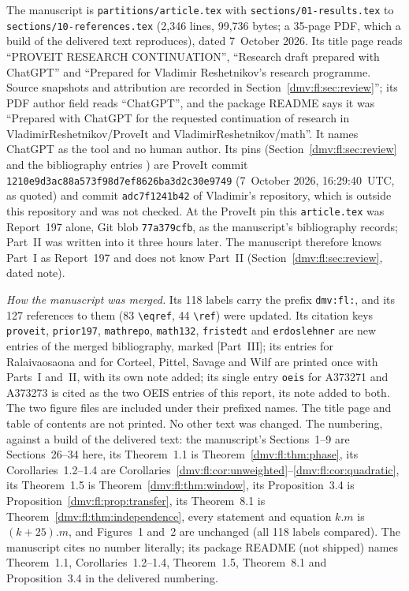 \documentclass[11pt,letterpaper]{article}
\numberwithin{equation}{section}
\theoremstyle{definition}\newtheorem{definition}[theorem]{Definition}
\theoremstyle{remark}\newtheorem{remark}[theorem]{Remark}
\newcommand{\code}[1]{\texttt{\detokenize{#1}}}
\newcommand{\file}[1]{\nolinkurl{#1}}
\begin{document}
The manuscript is \file{partitions/article.tex} with
\file{sections/01-results.tex} to \file{sections/10-references.tex}
(2{,}346 lines, 99{,}736 bytes; a 35-page PDF, which a build of the
delivered text reproduces), dated 7~October 2026. Its title page reads
``PROVEIT RESEARCH CONTINUATION'', ``Research draft prepared with
ChatGPT'' and ``Prepared for Vladimir Reshetnikov's research programme.
Source snapshots and attribution are recorded in
Section~\ref{dmv:fl:sec:review}''; its PDF author field reads
``ChatGPT'', and the package README says it was ``Prepared with ChatGPT
for the requested continuation of research in VladimirReshetnikov/ProveIt
and VladimirReshetnikov/math''. It names ChatGPT as the tool and no human
author. Its pins (Section~\ref{dmv:fl:sec:review} and the bibliography
entries \cite{proveit,prior197,mathrepo}) are ProveIt commit
\file{1210e9d3ac88a573f98d7ef8626ba3d2c30e9749} (7~October 2026,
16:29:40~UTC, as quoted) and commit \file{adc7f1241b42} of Vladimir's
\code{math} repository, which is outside this repository and was not
checked. At the ProveIt pin this \file{article.tex} was Report~197 alone,
Git blob \file{77a379cfb}, as the manuscript's bibliography records;
Part~II was written into it three hours later. The manuscript therefore
knows Part~I as Report~197 and does not know Part~II
(Section~\ref{dmv:fl:sec:review}, dated note).

\emph{How the manuscript was merged.} Its 118 labels carry the prefix
\file{dmv:fl:}, and its 127 references to them (83
\verb|\eqref|, 44 \verb|\ref|) were updated. Its citation keys
\file{proveit}, \file{prior197}, \file{mathrepo}, \file{math132},
\file{fristedt} and \file{erdoslehner} are new entries of the merged
bibliography, marked [Part~III]; its entries for Ralaivaosaona and for
Corteel, Pittel, Savage and Wilf are printed once with Parts~I and~II,
with its own note added; its single entry \file{oeis} for A373271 and
A373273 is cited as the two OEIS entries of this report, its note added
to both. The two figure files are included under their prefixed names.
The title page and table of contents are not printed. No other text was
changed. The numbering, against a build of the delivered text: the
manuscript's Sections~1--9 are Sections~26--34 here, its Theorem~1.1 is
Theorem~\ref{dmv:fl:thm:phase}, its Corollaries~1.2--1.4 are
Corollaries~\ref{dmv:fl:cor:unweighted}--\ref{dmv:fl:cor:quadratic}, its
Theorem~1.5 is Theorem~\ref{dmv:fl:thm:window}, its Proposition~3.4 is
Proposition~\ref{dmv:fl:prop:transfer}, its Theorem~8.1 is
Theorem~\ref{dmv:fl:thm:independence}, every statement and equation
$k.m$ is $(k{+}25).m$, and Figures~1 and~2 are unchanged (all 118 labels
compared). The manuscript cites no number literally; its package README
(not shipped) names Theorem~1.1, Corollaries~1.2--1.4, Theorem~1.5,
Theorem~8.1 and Proposition~3.4 in the delivered numbering.
\end{document}
